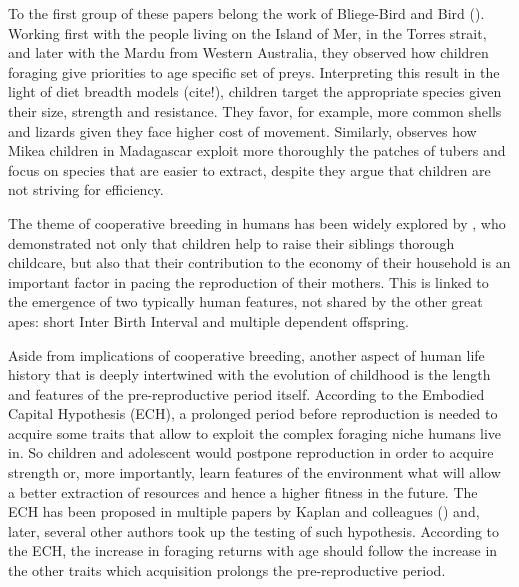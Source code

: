 To the first group of these papers belong the work of Bliege-Bird and Bird (\cite{bliege_bird_children_1995, bird_ethnoarchaeology_2000, bird_constraints_2002, bird_children_2002, bird_mardu_2005}). Working first with the people living on the Island of Mer, in the Torres strait, and later with the Mardu from Western Australia, they observed how children foraging give priorities to age specific set of preys. Interpreting this result in the light of diet breadth models (cite!), children target the appropriate species given their size, strength and resistance. They favor, for example, more common shells and lizards given they face higher cost of movement. 
Similarly, \cite{tucker_growing_2005} observes how Mikea children in Madagascar exploit more thoroughly the patches of tubers and focus on species that are easier to extract, despite they argue that children are not striving for efficiency. 

The theme of cooperative breeding in humans has been widely explored by \cite{kramer_variation_2002, kramer_maya_2005, kramer_childrens_2005, kramer_does_2009}, who demonstrated not only that children help to raise their siblings thorough childcare, but also that their contribution to the economy of their household is an important factor in pacing the reproduction of their mothers. This is linked to the emergence of two typically human features, not shared by the other great apes: short Inter Birth Interval and multiple dependent offspring.

Aside from implications of cooperative breeding, another aspect of human life history that is deeply intertwined with the evolution of childhood is the length and features of the pre-reproductive period itself. 
According to the Embodied Capital Hypothesis (ECH), a prolonged period before reproduction is needed to acquire some traits that allow to exploit the complex foraging niche humans live in. So children and adolescent would postpone reproduction in order to acquire strength or, more importantly, learn features of the environment what will allow a better extraction of resources and hence a higher fitness in the future. The ECH has been proposed in multiple papers by Kaplan and colleagues (\cite{kaplan_theory_2000, kaplan_theory_1996, kaplan_evolution_1997, kaplan_embodied_2001, kaplan_emergence_2002, kaplan_embodied_2003, kaplan_neural_2003, kaplan_life_2006, kaplan_evolution_2007}) and, later, several other authors took up the testing of such hypothesis. According to the ECH, the increase in foraging returns with age should follow the increase in the other traits which acquisition prolongs the pre-reproductive period.

